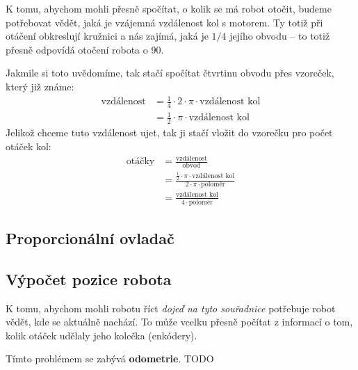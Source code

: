 \documentclass[../main.tex]{subfiles}
\begin{document}
	\begin{solution*}
		K tomu, abychom mohli přesně spočítat, o kolik se má robot otočit, budeme potřebovat vědět, jaká je vzájemná vzdálenost kol s motorem. Ty totiž při otáčení obkreslují kružnici a nás zajímá, jaká je $1/4$ jejího obvodu -- to totiž přesně odpovídá otočení robota o 90\degree.

		Jakmile si toto uvědomíme, tak stačí spočítat čtvrtinu obvodu přes vzoreček, který již známe:
		$$
		\begin{aligned}
			\text{vzdálenost} &= \frac{1}{4} \cdot 2 \cdot \pi \cdot \text{vzdálenost kol} \\
			&= \frac{1}{2} \cdot \pi \cdot \text{vzdálenost kol}
		\end{aligned}
		$$
		Jelikož chceme tuto vzdálenost ujet, tak ji stačí vložit do vzorečku pro počet otáček kol:
		$$
		\begin{aligned}
			\text{otáčky} &= \frac{\text{vzdálenost}}{\text{obvod}} \\
			&=  \frac{\frac{1}{2} \cdot \pi \cdot \text{vzdálenost kol}}{2 \cdot \pi \cdot \text{poloměr}}  \\
			&= \frac{\text{vzdálenost kol}}{4 \cdot \text{poloměr}}
		\end{aligned}
		$$
	\end{solution*}

	\subsection{Proporcionální ovladač}

	\subsection{Výpočet pozice robota}
	K tomu, abychom mohli robotu říct \textit{dojeď na tyto souřadnice} potřebuje robot vědět, kde se aktuálně nachází. To může vcelku přesně počítat z informací o tom, kolik otáček udělaly jeho kolečka (enkódery).

	Tímto problémem se zabývá \textbf{odometrie}. TODO
\end{document}
